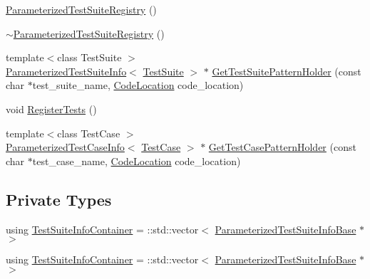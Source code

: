 \begin{DoxyCompactItemize}
\item 
\mbox{\hyperlink{classtesting_1_1internal_1_1_parameterized_test_suite_registry_ae3827c085ed16faaa9197486513292c0}{Parameterized\+Test\+Suite\+Registry}} ()
\item 
\mbox{\hyperlink{classtesting_1_1internal_1_1_parameterized_test_suite_registry_ab29f7a321883945d7f86f3292c100eb5}{$\sim$\+Parameterized\+Test\+Suite\+Registry}} ()
\item 
{\footnotesize template$<$class Test\+Suite $>$ }\\\mbox{\hyperlink{classtesting_1_1internal_1_1_parameterized_test_suite_info}{Parameterized\+Test\+Suite\+Info}}$<$ \mbox{\hyperlink{classtesting_1_1_test_suite}{Test\+Suite}} $>$ $\ast$ \mbox{\hyperlink{classtesting_1_1internal_1_1_parameterized_test_suite_registry_a89ef6dd228f4188e1928513e860580d0}{Get\+Test\+Suite\+Pattern\+Holder}} (const char $\ast$test\+\_\+suite\+\_\+name, \mbox{\hyperlink{structtesting_1_1internal_1_1_code_location}{Code\+Location}} code\+\_\+location)
\item 
void \mbox{\hyperlink{classtesting_1_1internal_1_1_parameterized_test_suite_registry_a44c2ee0296de42dc6ca7abbf48d00495}{Register\+Tests}} ()
\item 
{\footnotesize template$<$class Test\+Case $>$ }\\\mbox{\hyperlink{classtesting_1_1internal_1_1_parameterized_test_case_info}{Parameterized\+Test\+Case\+Info}}$<$ \mbox{\hyperlink{classtesting_1_1_test_case}{Test\+Case}} $>$ $\ast$ \mbox{\hyperlink{classtesting_1_1internal_1_1_parameterized_test_suite_registry_a3fe06fb4e1b4194dae1fbcdf3560fbd3}{Get\+Test\+Case\+Pattern\+Holder}} (const char $\ast$test\+\_\+case\+\_\+name, \mbox{\hyperlink{structtesting_1_1internal_1_1_code_location}{Code\+Location}} code\+\_\+location)
\end{DoxyCompactItemize}
\subsection*{Private Types}
\begin{DoxyCompactItemize}
\item 
using \mbox{\hyperlink{classtesting_1_1internal_1_1_parameterized_test_suite_registry_a39a8d3dfa91cb48329bfcf0853f0e72b}{Test\+Suite\+Info\+Container}} = \+::std\+::vector$<$ \mbox{\hyperlink{classtesting_1_1internal_1_1_parameterized_test_suite_info_base}{Parameterized\+Test\+Suite\+Info\+Base}} $\ast$ $>$
\item 
using \mbox{\hyperlink{classtesting_1_1internal_1_1_parameterized_test_suite_registry_a39a8d3dfa91cb48329bfcf0853f0e72b}{Test\+Suite\+Info\+Container}} = \+::std\+::vector$<$ \mbox{\hyperlink{classtesting_1_1internal_1_1_parameterized_test_suite_info_base}{Parameterized\+Test\+Suite\+Info\+Base}} $\ast$ $>$
\end{DoxyCompactItemize}
